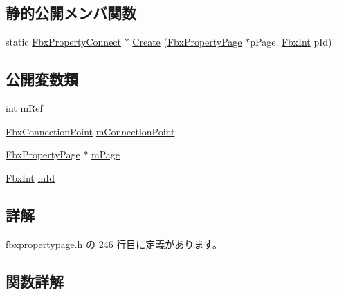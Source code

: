 \subsection*{静的公開メンバ関数}
\begin{DoxyCompactItemize}
\item 
static \hyperlink{class_fbx_property_connect}{Fbx\+Property\+Connect} $\ast$ \hyperlink{class_fbx_property_connect_aa9dc912c6e7b5185f0afa7af81c55e85}{Create} (\hyperlink{class_fbx_property_page}{Fbx\+Property\+Page} $\ast$p\+Page, \hyperlink{fbxtypes_8h_a088fa96de3b0b3ea69f0f6afef525dfb}{Fbx\+Int} p\+Id)
\end{DoxyCompactItemize}
\subsection*{公開変数類}
\begin{DoxyCompactItemize}
\item 
int \hyperlink{class_fbx_property_connect_a4bc3cc9dabbd6ffb4e25ab37b84f80b4}{m\+Ref}
\item 
\hyperlink{class_fbx_connection_point}{Fbx\+Connection\+Point} \hyperlink{class_fbx_property_connect_a35dc1915c687d3d2b51a55c7eba0e80c}{m\+Connection\+Point}
\item 
\hyperlink{class_fbx_property_page}{Fbx\+Property\+Page} $\ast$ \hyperlink{class_fbx_property_connect_a08654feca214b0f552c333115c6264fe}{m\+Page}
\item 
\hyperlink{fbxtypes_8h_a088fa96de3b0b3ea69f0f6afef525dfb}{Fbx\+Int} \hyperlink{class_fbx_property_connect_abce4165e9ad7ed40341d8988763f083c}{m\+Id}
\end{DoxyCompactItemize}


\subsection{詳解}


 fbxpropertypage.\+h の 246 行目に定義があります。



\subsection{関数詳解}
\mbox{\label{class_fbx_property_connect_a993c2baae886bb7259a5246ef2e791f3}} 
